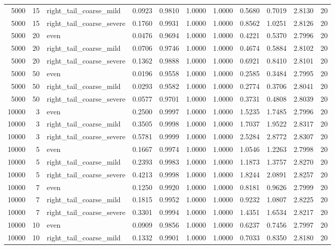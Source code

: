 \begin{table}[!h]
{\begin{tabular}[t]{rrlrrrrrrrr}
5000 & 15 & right\_tail\_coarse\_mild & 0.0923 & 0.9810 & 1.0000 & 1.0000 & 0.5680 & 0.7019 & 2.8130 & 20\\
5000 & 15 & right\_tail\_coarse\_severe & 0.1760 & 0.9931 & 1.0000 & 1.0000 & 0.8562 & 1.0251 & 2.8126 & 20\\
5000 & 20 & even & 0.0476 & 0.9694 & 1.0000 & 1.0000 & 0.4221 & 0.5370 & 2.7996 & 20\\
5000 & 20 & right\_tail\_coarse\_mild & 0.0706 & 0.9746 & 1.0000 & 1.0000 & 0.4674 & 0.5884 & 2.8102 & 20\\
5000 & 20 & right\_tail\_coarse\_severe & 0.1362 & 0.9888 & 1.0000 & 1.0000 & 0.6921 & 0.8410 & 2.8101 & 20\\
5000 & 50 & even & 0.0196 & 0.9558 & 1.0000 & 1.0000 & 0.2585 & 0.3484 & 2.7995 & 20\\
5000 & 50 & right\_tail\_coarse\_mild & 0.0293 & 0.9582 & 1.0000 & 1.0000 & 0.2774 & 0.3706 & 2.8041 & 20\\
5000 & 50 & right\_tail\_coarse\_severe & 0.0577 & 0.9701 & 1.0000 & 1.0000 & 0.3731 & 0.4808 & 2.8039 & 20\\
10000 & 3 & even & 0.2500 & 0.9997 & 1.0000 & 1.0000 & 1.5235 & 1.7485 & 2.7996 & 20\\
10000 & 3 & right\_tail\_coarse\_mild & 0.3505 & 0.9998 & 1.0000 & 1.0000 & 1.7037 & 1.9522 & 2.8317 & 20\\
10000 & 3 & right\_tail\_coarse\_severe & 0.5781 & 0.9999 & 1.0000 & 1.0000 & 2.5284 & 2.8772 & 2.8307 & 20\\
10000 & 5 & even & 0.1667 & 0.9974 & 1.0000 & 1.0000 & 1.0546 & 1.2263 & 2.7998 & 20\\
10000 & 5 & right\_tail\_coarse\_mild & 0.2393 & 0.9983 & 1.0000 & 1.0000 & 1.1873 & 1.3757 & 2.8270 & 20\\
10000 & 5 & right\_tail\_coarse\_severe & 0.4213 & 0.9998 & 1.0000 & 1.0000 & 1.8244 & 2.0891 & 2.8257 & 20\\
10000 & 7 & even & 0.1250 & 0.9920 & 1.0000 & 1.0000 & 0.8181 & 0.9626 & 2.7999 & 20\\
10000 & 7 & right\_tail\_coarse\_mild & 0.1815 & 0.9952 & 1.0000 & 1.0000 & 0.9232 & 1.0807 & 2.8225 & 20\\
10000 & 7 & right\_tail\_coarse\_severe & 0.3301 & 0.9994 & 1.0000 & 1.0000 & 1.4351 & 1.6534 & 2.8217 & 20\\
10000 & 10 & even & 0.0909 & 0.9856 & 1.0000 & 1.0000 & 0.6237 & 0.7456 & 2.7997 & 20\\
10000 & 10 & right\_tail\_coarse\_mild & 0.1332 & 0.9901 & 1.0000 & 1.0000 & 0.7033 & 0.8350 & 2.8180 & 20\\

\end{tabular}}
\end{table}
